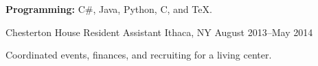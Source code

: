 \documentclass[11pt, letterpaper]{awesome-cv}
\begin{document}
\begin{cvparagraph}

\textbf{Programming:} C\#, Java, Python, C, and \TeX.
\end{cvparagraph}

\begin{cventries}
\cventry
	{Chesterton House}
	{Resident Assistant}
	{Ithaca, NY}
	{August 2013--May 2014}
	{
		\begin{cvitems}
			\item{Coordinated events, finances, and recruiting for a living center.}
		\end{cvitems}
	}
	
\end{cventries}
\end{document}
